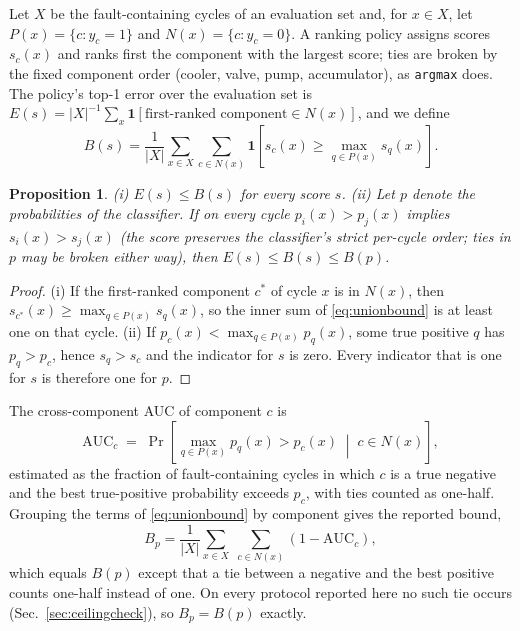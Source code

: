 \documentclass[journal]{IEEEtran}
\newtheorem{proposition}{Proposition}
\begin{document}
Let $X$ be the fault-containing cycles of an evaluation set and, for $x\in X$, let
$P(x)=\{c:y_c=1\}$ and $N(x)=\{c:y_c=0\}$. A ranking policy assigns scores
$s_c(x)$ and ranks first the component with the largest score; ties are broken by
the fixed component order (cooler, valve, pump, accumulator), as \texttt{argmax}
does. The policy's top-1 error over the evaluation set is $E(s)=|X|^{-1}\sum_{x}\mathbf{1}[\text{first-ranked
component}\in N(x)]$, and we define
\begin{equation}
B(s)=\frac{1}{|X|}\sum_{x\in X}\sum_{c\in N(x)}\mathbf{1}\!\left[s_c(x)\ge\max_{q\in P(x)}s_q(x)\right].
\label{eq:unionbound}
\end{equation}

\begin{proposition}
\label{prop:bound}
(i) $E(s)\le B(s)$ for every score $s$. (ii) Let $p$ denote the probabilities of the classifier. If on every cycle $p_i(x)>p_j(x)$ implies $s_i(x)>s_j(x)$ (the score
preserves the classifier's strict per-cycle order; ties in $p$ may be broken
either way), then $E(s)\le B(s)\le B(p)$.
\end{proposition}
\begin{proof}
(i) If the first-ranked component $c^\ast$ of cycle $x$ is in $N(x)$, then
$s_{c^\ast}(x)\ge\max_{q\in P(x)}s_q(x)$, so the inner sum of \eqref{eq:unionbound}
is at least one on that cycle. (ii) If $p_c(x)<\max_{q\in P(x)}p_q(x)$, some true
positive $q$ has $p_q>p_c$, hence $s_q>s_c$ and the indicator for $s$ is zero.
Every indicator that is one for $s$ is therefore one for $p$.
\end{proof}

The cross-component AUC of component $c$ is
\begin{equation}
\mathrm{AUC}_c \;=\; \Pr\!\left[\max_{q\in P(x)} p_q(x) > p_c(x) \;\middle|\; c\in N(x)\right],
\label{eq:crossauc}
\end{equation}
estimated as the fraction of fault-containing cycles in which $c$ is a true
negative and the best true-positive probability exceeds $p_c$, with ties counted as
one-half. Grouping the terms of \eqref{eq:unionbound} by component gives the
reported bound,
\begin{equation}
B_p=\frac{1}{|X|}\sum_{x\in X}\;\sum_{c\in N(x)} \left(1-\mathrm{AUC}_c\right),
\label{eq:ceilingbound}
\end{equation}
which equals $B(p)$ except that a tie between a negative and the best positive
counts one-half instead of one. On every protocol reported here no such tie occurs
(Sec.~\ref{sec:ceilingcheck}), so $B_p=B(p)$ exactly.
\end{document}
